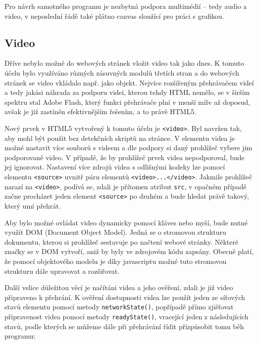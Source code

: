 Pro návrh samotného programu je nezbytná podpora multimédií – tedy audio a video, v neposlední řádě také plátno canvas sloužící pro práci s grafikou.



\subsection{Video}
Dříve nebylo možné do webových stránek vložit video tak jako dnes. K tomuto účelu bylo využíváno různých zásuvných modulů třetích stran a do webových stránek se video vkládalo např. jako objekt. Nejvíce rozšířeným přehrávačem videí a tedy jakási náhrada za podporu videí, kterou tehdy HTML nemělo, se v širším spektru stal Adobe Flash, který funkci přehrávače plní v menší míře až doposud, avšak je již zastíněn efektivnějším řešením, a to právě HTML5.

Nový prvek v HTML5 vytvořený k tomuto účelu je \texttt{<video>}. Byl navržen tak, aby mohl být použit bez detekčních skriptů na stránce. V elementu videa je možné nastavit více souborů s videem a dle podpory si daný prohlížeč vybere jim podporované video. V případě, že by prohlížeč prvek videa nepodporoval, bude jej ignorovat. Nastavení více zdrojů videa s odlišnými kodeky lze pomocí elementu \texttt{<source>} uvnitř páru elementů \texttt{<video>...</video>}. Jakmile prohlížeč narazí na \texttt{<video>}, podívá se, zdali je přítomen atribut \texttt{src}, v opačném případě začne procházet jeden element \texttt{<source>} po druhém a bude hledat právě takový, který umí přehrát.

Aby bylo možné ovládat video dynamicky pomocí kláves nebo myší, bude nutné využít DOM (Document Object Model). Jedná se o stromovou strukturu dokumentu, kterou si prohlížeč sestavuje po načtení webové stránky. Některé značky se v DOM vytvoří, aniž by byly ve zdrojovém kódu zapsány. Obecně platí, že pomocí objektového modelu je díky javascriptu možné tuto stromovou strukturu dále upravovat a rozšiřovat. 

\newpage

Další velice důležitou věcí je načítáni videa a jeho ověření, zdali  je již video připraveno k přehrání. K ověření dostupnosti videa lze použít jeden ze síťových stavů elementu pomocí metody \texttt{networkState()}, popřípadě přímo zjišťovat připravenost videa pomocí metody \texttt{readyState()}, vracející jeden z následujících stavů, podle kterých se můžeme dále při přehrávání řídit přizpůsobit tomu běh programu:



